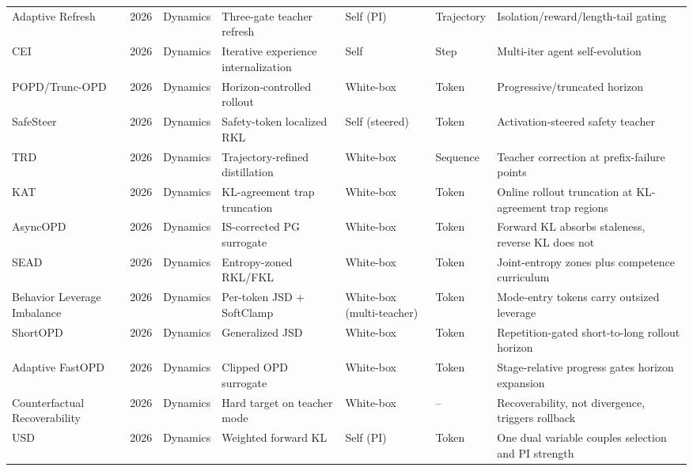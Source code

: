 \documentclass{article} %
\begin{document}
\begin{table}[t]
{\begin{tabular}{@{}lclllll@{}}
        Adaptive Refresh~\citep{2606.03532} & 2026 & Dynamics & Three-gate teacher refresh & Self (PI) & Trajectory & Isolation/reward/length-tail gating \\
        CEI~\citep{2606.04703} & 2026 & Dynamics & Iterative experience internalization & Self & Step & Multi-iter agent self-evolution \\
        POPD/Trunc-OPD~\citep{2605.31490} & 2026 & Dynamics & Horizon-controlled rollout & White-box & Token & Progressive/truncated horizon \\
        SafeSteer~\citep{2606.02530} & 2026 & Dynamics & Safety-token localized RKL & Self (steered) & Token & Activation-steered safety teacher \\
        TRD~\citep{2606.08432} & 2026 & Dynamics & Trajectory-refined distillation & White-box & Sequence & Teacher correction at prefix-failure points \\
        KAT~\citep{2606.09471} & 2026 & Dynamics & KL-agreement trap truncation & White-box & Token & Online rollout truncation at KL-agreement trap regions \\
        AsyncOPD~\citep{2606.24143} & 2026 & Dynamics & IS-corrected PG surrogate & White-box & Token & Forward KL absorbs staleness, reverse KL does not \\
        SEAD~\citep{2606.28562} & 2026 & Dynamics & Entropy-zoned RKL/FKL & White-box & Token & Joint-entropy zones plus competence curriculum \\
        Behavior Leverage Imbalance~\citep{2607.07050} & 2026 & Dynamics & Per-token JSD + SoftClamp & White-box (multi-teacher) & Token & Mode-entry tokens carry outsized leverage \\
        ShortOPD~\citep{2607.13124} & 2026 & Dynamics & Generalized JSD & White-box & Token & Repetition-gated short-to-long rollout horizon \\
        Adaptive FastOPD~\citep{2607.29494} & 2026 & Dynamics & Clipped OPD surrogate & White-box & Token & Stage-relative progress gates horizon expansion \\
        Counterfactual Recoverability~\citep{2608.04408} & 2026 & Dynamics & Hard target on teacher mode & White-box & -- & Recoverability, not divergence, triggers rollback \\
        USD~\citep{2608.08176} & 2026 & Dynamics & Weighted forward KL & Self (PI) & Token & One dual variable couples selection and PI strength \\
        \bottomrule
    \end{tabular}
    }
\end{table}
\end{document}
